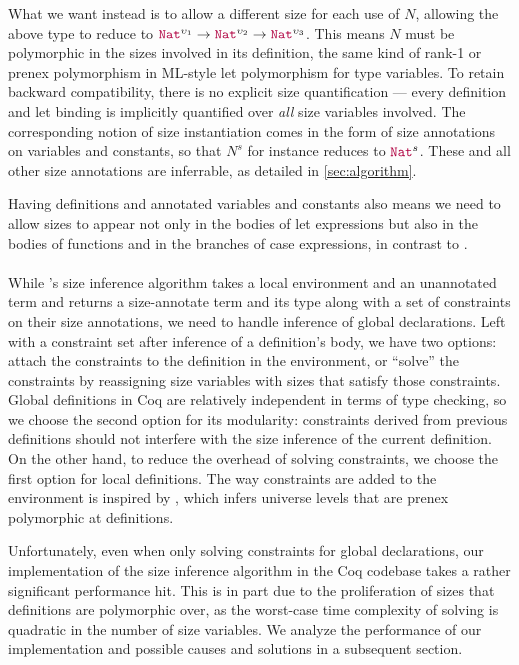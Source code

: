 What we want instead is to allow a different size for each use of $N$,
allowing the above type to reduce to $\Nat^{\upsilon_1} \rightarrow \Nat^{\upsilon_2} \rightarrow \Nat^{\upsilon_3}$.
This means $N$ must be polymorphic in the sizes involved in its definition,
the same kind of rank-1 or prenex polymorphism in ML-style let polymorphism for type variables.
To retain backward compatibility, there is no explicit size quantification ---
every definition and let binding is implicitly quantified over \emph{all} size variables involved.
The corresponding notion of size instantiation comes in the form of size annotations on variables and constants, so that $N^s$ for instance reduces to $\Nat^s$.
These and all other size annotations are inferrable, as detailed in \autoref{sec:algorithm}.

Having definitions and annotated variables and constants also means we need to allow sizes to appear
not only in the bodies of let expressions but also in the bodies of functions and in the branches of case expressions,
in contrast to \CIChatminus.

\paragraph*{} While \CIChat's size inference algorithm takes a local environment and an unannotated term
and returns a size-annotate term and its type along with a set of constraints on their size annotations,
we need to handle inference of global declarations.
Left with a constraint set after inference of a definition's body, we have two options:
attach the constraints to the definition in the environment,
or ``solve'' the constraints by reassigning size variables with sizes that satisfy those constraints.
Global definitions in Coq are relatively independent in terms of type checking,
so we choose the second option for its modularity:
constraints derived from previous definitions should not interfere with the size inference of the current definition.
On the other hand, to reduce the overhead of solving constraints,
we choose the first option for local definitions.
The way constraints are added to the environment is inspired by \citet{universes},
which infers universe levels that are prenex polymorphic at definitions.

Unfortunately, even when only solving constraints for global declarations,
our implementation of the size inference algorithm in the Coq codebase takes a rather significant performance hit.
This is in part due to the proliferation of sizes that definitions are polymorphic over,
as the worst-case time complexity of solving is quadratic in the number of size variables.
We analyze the performance of our implementation and possible causes and solutions in a subsequent section.

